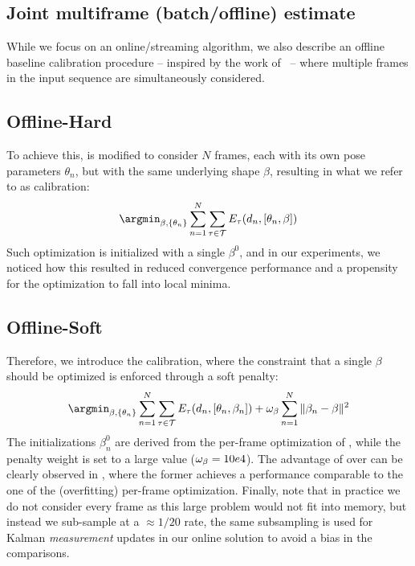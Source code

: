 

\subsection{Joint multiframe (batch/offline) estimate}
\label{sec:batch}
\label{sec:offline}
While we focus on an online/streaming algorithm, we also describe an offline baseline calibration procedure -- inspired by the work of~\cite{taylor2014user} -- where multiple frames in the input sequence are simultaneously considered. 

\subsection*{Offline-Hard}
To achieve this,  is modified to consider $N$ frames, each with its own pose parameters $\theta_n$, but with the same underlying shape $\beta$, resulting in what we refer to as \emph{\OfflineHard{}} calibration:
% 
\begin{equation}
\argmin_{\beta, \{\theta_n\} } \sum_{n=1}^N \sum_{\tau \in \mathcal{T}} E_{\tau}(d_n, [\theta_n, \beta]) 
\label{eq:offlinehard}
\end{equation}
% 
Such optimization is initialized with a single $\beta^0$, and in our experiments, we noticed how this resulted in reduced convergence performance and a propensity for the optimization to fall into local minima. 

\subsection*{Offline-Soft}
Therefore, we introduce the \emph{\OfflineSoft{}} calibration, where the constraint that a single $\beta$ should be optimized is enforced through a soft penalty:
% 
\begin{equation}
\argmin_{\beta, \{\theta_n\} } \sum_{n=1}^N \sum_{\tau \in \mathcal{T}} E_{\tau}(d_n, [\theta_n, \beta_n]) + \omega_{\beta} \sum_{n=1}^N \| \beta_n - \beta \|^2
\label{eq:offlinesoft}
\end{equation}
%
The initializations $\beta_n^0$ are derived from the per-frame optimization of , while the penalty weight is set to a large value ($\small \omega_{\beta}=10e4$). The advantage of \OfflineSoft{} over \OfflineHard{} can be clearly observed in , where the former achieves a performance comparable to the one of the (overfitting) per-frame optimization. Finally, note that in practice we do not consider every frame as this large problem would not fit into memory, but instead we sub-sample at a $\approx 1/20$ rate, the same subsampling is used for Kalman \emph{measurement} updates in our online solution to avoid a bias in the comparisons.

